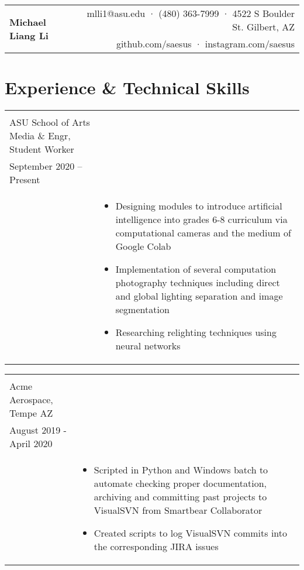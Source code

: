 \documentclass[10pt]{article}
\makeatletter
\newcommand{\headingtitle}[3]{
\begin{tabular*}{7in}{l@{\extracolsep{\fill}}r}
	\multirow{2}{*}{#1}&#2\\
	&#3\\
\end{tabular*}}
\newcommand{\tabu}[2]{
	\begin{tabular}[t]{ l l }
		#1 & #2
	\end{tabular}}
\makeatother
\begin{document}
	
	\headingtitle{\textbf{\huge Michael Liang Li}}{mlli1@asu.edu · (480) 363-7999 · 4522 S Boulder St. Gilbert, AZ}{github.com/saesus · instagram.com/saesus}
	\vspace{-2em}
	
	\section{Experience \& Technical Skills}
		\tabu
		{\begin{minipage}[t]{0.3\linewidth}
				\textbf{ImageSTEM} \\
				ASU School of Arts Media \& Engr, Student Worker\\
				September 2020 – Present\\
		\end{minipage}}
		{\begin{minipage}[t]{.7\linewidth}
				\begin{itemize}[noitemsep, topsep=0pt]
					\item Designing modules to introduce artificial intelligence into grades 6-8 curriculum via computational cameras and the medium of Google Colab
					\item Implementation of several computation photography techniques including direct and global lighting separation and image segmentation
					\item Researching relighting techniques using neural networks
				\end{itemize}
		\end{minipage}}	
	
		\tabu
		{\begin{minipage}[t]{0.3\linewidth}
				\textbf{Software Intern} \\
				Acme Aerospace, Tempe AZ\\
				August 2019 - April 2020\\
		\end{minipage}}
		{\begin{minipage}[t]{.7\linewidth}
				\begin{itemize}[noitemsep, topsep=0pt]
					\item Scripted in Python and Windows batch to automate checking proper documentation, archiving and committing past projects to VisualSVN from Smartbear Collaborator
					\item Created scripts to log VisualSVN commits into the corresponding JIRA issues
				\end{itemize}
		\end{minipage}}
	
\end{document}

